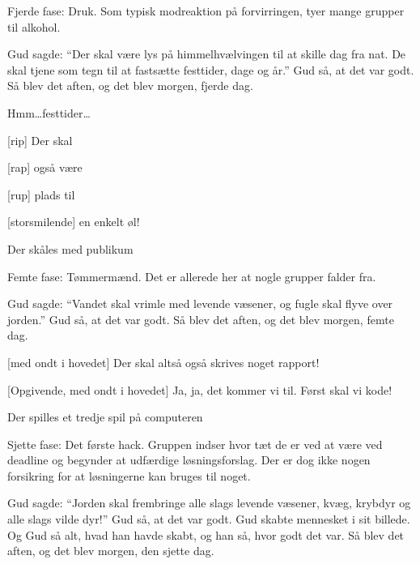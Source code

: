 \documentclass[danish]{article}
\begin{document}
\begin{sketch}


 Fjerde fase: Druk. Som typisk modreaktion på forvirringen, tyer mange
grupper til alkohol.

 Gud sagde: ``Der skal være lys på himmelhvælvingen til at skille dag
fra nat. De skal tjene som tegn til at fastsætte festtider, dage og år.'' Gud så,
at det var godt. Så blev det aften, og det blev morgen, fjerde dag.

 Hmm\ldots festtider\ldots

[rip] Der skal

[rap] også være

[rup] plads til

[storsmilende] en enkelt øl!

\scene Der skåles med publikum



 Femte fase: Tømmermænd. Det er allerede her at nogle grupper falder
fra. 

 Gud sagde: ``Vandet skal vrimle med levende væsener, og fugle skal
flyve over jorden.'' Gud så, at det var godt. Så blev det aften, og det blev
morgen, femte dag.

[med ondt i hovedet] Der skal altså også skrives noget rapport!

[Opgivende, med ondt i hovedet] Ja, ja, det kommer vi til. Først
skal vi kode!

\scene Der spilles et tredje spil på computeren



 Sjette fase: Det første hack. Gruppen indser hvor tæt de er ved at være
ved deadline og begynder at udfærdige løsningsforslag. Der er dog ikke nogen
forsikring for at løsningerne kan bruges til noget.

 Gud sagde: ``Jorden skal frembringe alle slags levende væsener, kvæg,
krybdyr og alle slags vilde dyr!'' Gud så, at det var godt. Gud skabte mennesket
i sit billede. Og Gud så alt, hvad han havde skabt, og han så, hvor godt det
var. Så blev det aften, og det blev morgen, den sjette dag.


\end{sketch}
\end{document}
